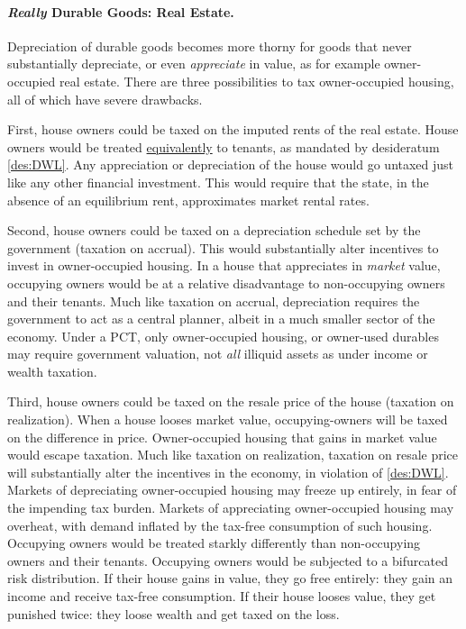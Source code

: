 \paragraph{\emph{Really} Durable Goods: Real Estate.} Depreciation of durable goods becomes more thorny for goods that never substantially depreciate, or even \emph{appreciate} in value, as for example owner-occupied real estate. There are three possibilities to tax owner-occupied housing, all of which have severe drawbacks.

First, house owners could be taxed on the imputed rents of the real estate. House owners would be treated \hyperref[des:DWL]{equivalently} to tenants, as mandated by desideratum \ref{des:DWL}. Any appreciation or depreciation of the house would go untaxed just like any other financial investment. This would require that the state, in the absence of an equilibrium rent, approximates market rental rates. 

Second, house owners could be taxed on a depreciation schedule set by the government (taxation on accrual). This would substantially alter incentives to invest in owner-occupied housing. In a house that appreciates in \emph{market} value, occupying owners would be at a relative disadvantage to non-occupying owners and their tenants. Much like taxation on accrual, depreciation requires the government to act as a central planner, albeit in a much smaller sector of the economy. Under a PCT, only owner-occupied housing, or owner-used durables may require government valuation, not \emph{all} illiquid assets as under income or wealth taxation.

Third, house owners could be taxed on the resale price of the house (taxation on realization). When a house looses market value, occupying-owners will be taxed on the difference in price. Owner-occupied housing that gains in market value would escape taxation. Much like taxation on realization, taxation on resale price will substantially alter the incentives in the economy, in violation of \ref{des:DWL}. Markets of depreciating owner-occupied housing may freeze up entirely, in fear of the impending tax burden. Markets of appreciating owner-occupied housing may overheat, with demand inflated by the tax-free consumption of such housing. Occupying owners would be treated starkly differently than non-occupying owners and their tenants. Occupying owners would be subjected to a bifurcated risk distribution. If their house gains in value, they go free entirely: they gain an income and receive tax-free consumption. If their house looses value, they get punished twice: they loose wealth and get taxed on the loss.

